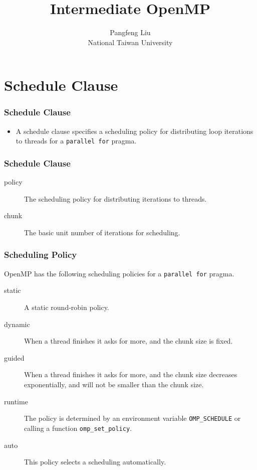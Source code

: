 \documentclass{beamer}
\begin{document}
\title{Intermediate OpenMP}

\author{Pangfeng Liu \\ National Taiwan University}

\begin{frame}
  \titlepage
\end{frame}

\section{Schedule Clause}

\begin{frame}
  \frametitle{Schedule Clause} 
  \begin{itemize}
    \item A schedule clause specifies a scheduling policy for
      distributing loop iterations to threads for a {\tt parallel for}
      pragma.
  \end{itemize}
\end{frame}

\begin{frame}
  \frametitle{Schedule Clause} 
  \begin{description} 
  \item [policy] The scheduling policy for distributing iterations to
    threads.
  \item [chunk] The basic unit number of iterations for scheduling.
  \end{description}
\end{frame}

\begin{frame}
  \frametitle{Scheduling Policy} OpenMP has the following scheduling
  policies for a {\tt parallel for} pragma.
  \begin{description}
  \item [static] A static round-robin policy.
  \item [dynamic] When a thread finishes it asks for more, and the
    chunk size is fixed.
  \item [guided] When a thread finishes it asks for more, and the
    chunk size decreases exponentially, and will not be smaller than
    the chunk size.
  \item [runtime] The policy is determined by an environment variable
    {\tt OMP\_SCHEDULE} or calling a function {\tt omp\_set\_policy}.
  \item [auto] This policy selects a scheduling automatically.
  \end{description}
\end{frame}
\end{document}
